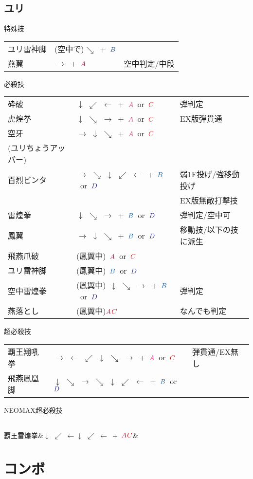 \documentclass[a4j,11pt]{jarticle}
\def\A{$\textcolor{Acolor}{A}$}
\def\C{$\textcolor{Ccolor}{C}$}
\def\B{$\textcolor{Bcolor}{B}$}
\def\D{$\textcolor{Dcolor}{D}$}
\def\hado{$\downarrow$ $\searrow$ $\rightarrow$}%
\def\tatsu{$\downarrow$ $\swarrow$ $\leftarrow$}%
\def\syoryu{$\rightarrow$ $\downarrow$ $\searrow$}%
\def\yoga{$\leftarrow$ $\swarrow$ $\downarrow$ $\searrow$ $\rightarrow$}%
\def\gyakuyoga{$\rightarrow$ $\searrow$ $\downarrow$ $\swarrow$ $\leftarrow$}%
\def\ryuko{$\downarrow$ $\searrow$ $\rightarrow$ $\searrow$ $\downarrow$ $\swarrow$ $\leftarrow$}%
\begin{document}
\subsection{ユリ}
\begin{itembox}[l]{特殊技}
\begin{tabular}{lll}
ユリ雷神脚&(空中で)$\searrow$\ +\ \B&\\%
燕翼&$\rightarrow$\ +\ \A&空中判定/中段
\end{tabular}
\end{itembox}
\begin{itembox}[l]{必殺技}
\begin{tabular}{lll}
砕破&\tatsu\ +\ \A\ or\ \C&弾判定\\%
虎煌拳&\hado\ +\ \A\ or\ \C&EX版弾貫通\\%
空牙&\syoryu\ +\ \A\ or\ \C&\\%
(ユリちょうアッパー)&&\\
百烈ビンタ&\gyakuyoga\ +\ \B\ or\ \D&弱1F投げ/強移動投げ\\
&&EX版無敵打撃技\\%
雷煌拳&\hado\ +\ \B\ or\ \D&弾判定/空中可\\%
鳳翼&\syoryu\ +\ \B\ or\ \D&移動技/以下の技に派生\\%
飛燕爪破&(鳳翼中)\ \A\ or\ \C&\\%
ユリ雷神脚&(鳳翼中)\ \B\ or\ \D&\\%
空中雷煌拳&(鳳翼中)\ \hado\ +\ \B\ or\ \D&弾判定\\%
燕落とし&(鳳翼中)\A\C&なんでも判定%
\end{tabular}
\end{itembox}
\begin{itembox}[l]{超必殺技}
\begin{tabular}{lll}
覇王翔吼拳&$\rightarrow$ \yoga\ +\ \A\ or\ \C&弾貫通/EX無し\\%
飛燕鳳凰脚&\ryuko\ +\ \B\ or\ \D&%
\end{tabular}
\end{itembox}
\begin{itembox}[l]{NEOMAX超必殺技}
\begin{tabular}{lll}
\end{tabular}
覇王雷煌拳&\tatsu\tatsu\ +\ \A\C&%
\end{itembox}
\newpage
\section{コンボ}
\end{document}

